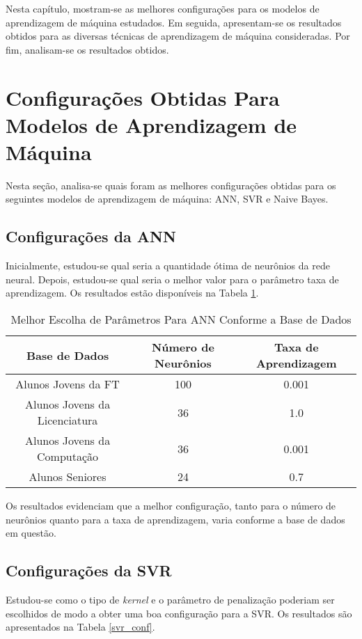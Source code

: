 
Nesta capítulo, mostram-se as melhores configurações para os modelos de aprendizagem
de máquina estudados. Em seguida, apresentam-se os resultados obtidos para as
diversas técnicas de aprendizagem de máquina consideradas. Por fim, analisam-se os
resultados obtidos. 

\section{Configurações Obtidas Para Modelos de Aprendizagem de Máquina}
\label{conf_ml_models}
Nesta seção, analisa-se quais foram as melhores configurações obtidas para os
seguintes modelos de aprendizagem de máquina: ANN, SVR e Naive Bayes. 

\subsection{Configurações da ANN}
Inicialmente, estudou-se qual seria a quantidade ótima de neurônios da rede neural.
Depois, estudou-se qual seria o melhor valor para o parâmetro taxa de aprendizagem. 
Os resultados estão disponíveis na Tabela \ref{conf_ann}. 

\begin{table}
\begin{center}
\begin{tabular}[c]{| c | c | c |}
    \hline
    \textbf{Base de Dados} & \textbf{Número de Neurônios} & \textbf{Taxa de
    Aprendizagem} \\
    \hline
    Alunos Jovens da FT & 100 & 0.001 \\
    \hline
    Alunos Jovens da Licenciatura & 36 & 1.0 \\
    \hline
    Alunos Jovens da Computação & 36 & 0.001 \\
    \hline
    Alunos Seniores & 24  & 0.7 \\
    \hline
\end{tabular}
\end{center}
\caption{Melhor Escolha de Parâmetros Para ANN Conforme a Base de Dados}
\label{conf_ann}
\end{table}

Os resultados evidenciam que a melhor configuração, tanto para o número de neurônios
quanto para a taxa de aprendizagem, varia conforme a base de dados em questão. 

\subsection{Configurações da SVR}
Estudou-se como o tipo de \textit{kernel} e o parâmetro de penalização
poderiam ser escolhidos de modo a obter uma boa configuração para a SVR. Os
resultados são apresentados na Tabela \ref{svr_conf}. 

